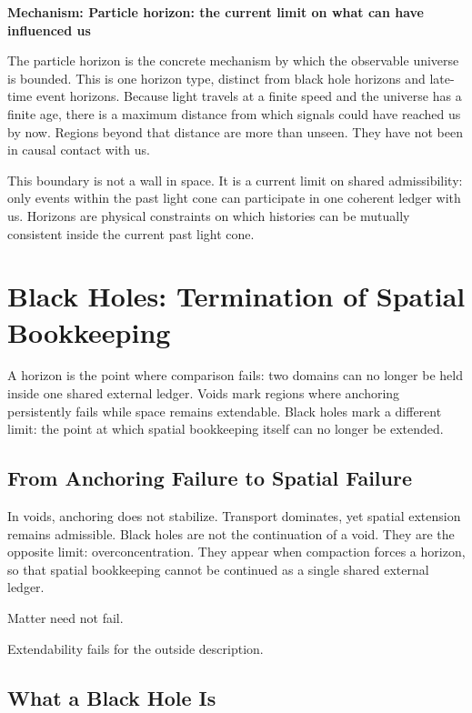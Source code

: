 \documentclass[11pt,twoside,openright]{book}
\newenvironment{mechanismbox}[1]
  {\begin{framed}\noindent\textbf{Mechanism: #1}\par\medskip}
  {\end{framed}}
\begin{document}
\begin{mechanismbox}{Particle horizon: the current limit on what can have influenced us}

The particle horizon is the concrete mechanism by which the observable universe is bounded. This is one horizon type, distinct from black hole horizons and late-time event horizons. Because light travels at a finite speed and the universe has a finite age, there is a maximum distance from which signals could have reached us by now. Regions beyond that distance are more than unseen. They have not been in causal contact with us.

This boundary is not a wall in space. It is a current limit on shared admissibility: only events within the past light cone can participate in one coherent ledger with us. Horizons are physical constraints on which histories can be mutually consistent inside the current past light cone.

\end{mechanismbox}
\chapter{Black Holes: Termination of Spatial Bookkeeping}

A horizon is the point where comparison fails: two domains can no longer be held inside one shared external ledger. Voids mark regions where anchoring persistently fails while space remains extendable. Black holes mark a different limit: the point at which spatial bookkeeping itself can no longer be extended.

\section*{From Anchoring Failure to Spatial Failure}

In voids, anchoring does not stabilize. Transport dominates, yet spatial extension remains admissible. Black holes are not the continuation of a void. They are the opposite limit: overconcentration. They appear when compaction forces a horizon, so that spatial bookkeeping cannot be continued as a single shared external ledger.

Matter need not fail.

Extendability fails for the outside description.

\section*{What a Black Hole Is}
\end{document}

